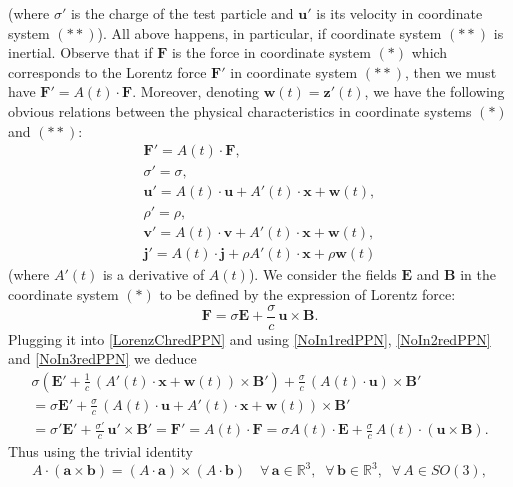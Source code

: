 \documentclass{article}
\theoremstyle{definition}
\theoremstyle{remark}
\renewcommand{\vec}[1]{\mathbf{#1}}
\newcommand{\R}{\mathbb{R}}
\newcommand{\er}{\eqref}
\newcommand{\R}{{\mathbb{R}}}
\newcommand{\er}{\eqref}
\begin{document}
(where $\sigma'$ is the charge of the test particle and $\vec u'$ is
its velocity in coordinate system $(**)$). All above happens, in
particular, if coordinate system $(**)$ is inertial. Observe that if
$\vec F$ is the force in coordinate system $(*)$ which corresponds
to the Lorentz force $\vec F'$ in coordinate system $(**)$, then we
must have $\vec F'=A(t)\cdot\vec F$. Moreover, denoting $\vec
w(t)=\vec z'(t)$, we have the following obvious relations between
the physical characteristics in coordinate systems $(*)$ and $(**)$:
\begin{align}
\label{NoIn1redPPN}\vec F'=A(t)\cdot\vec F,\\
\label{NoIn2redPPN}\sigma'=\sigma,\\
\label{NoIn3redPPN}\vec u'=A(t)\cdot \vec u+A'(t)\cdot\vec x+\vec w(t),\\
\label{NoIn4redPPN}\rho'=\rho,\\
\label{NoIn5redPPN}\vec v'=A(t)\cdot \vec v+A'(t)\cdot\vec x+\vec w(t),\\
\label{NoIn6redPPN}\vec j'=A(t)\cdot \vec j+\rho A'(t)\cdot\vec
x+\rho\vec w(t)
\end{align}
(where $A'(t)$ is a derivative of $A(t)$). We consider the fields
$\vec E$ and $\vec B$ in the coordinate system $(*)$ to be defined
by the expression of Lorentz force:
\begin{equation}\label{LorenzChllredPPN}
\vec F=\sigma \vec E+\frac{\sigma}{c}\,\vec u\times \vec B.
\end{equation}
Plugging it into \er{LorenzChredPPN} and using \er{NoIn1redPPN},
\er{NoIn2redPPN} and \er{NoIn3redPPN} we deduce
\begin{multline}\label{buiguyfttyjredPPN}
\sigma \left(\vec E'+\frac{1}{c}\,\left(A'(t)\cdot\vec x+\vec
w(t)\right)\times \vec B'\right)+\frac{\sigma}{c}\,\left(A(t)\cdot
\vec u\right)\times \vec B'\\=\sigma \vec
E'+\frac{\sigma}{c}\,\left(A(t)\cdot \vec u+A'(t)\cdot\vec x+\vec
w(t)\right)\times \vec B'\\=\sigma' \vec E'+\frac{\sigma'}{c}\,\vec
u'\times \vec B'=\vec F'=A(t)\cdot\vec F=\sigma A(t)\cdot\vec
E+\frac{\sigma}{c}\,A(t)\cdot\left(\vec u\times \vec B\right).
\end{multline}
Thus using the trivial identity
\begin{equation}\label{cufuyggjjjfredPPN}
A\cdot\left(\vec a\times\vec b\right)=\left(A\cdot\vec
a\right)\times\left(A\cdot\vec b\right)\quad\forall\, \vec
a\in\R^3,\;\;\forall\, \vec b\in\R^3,\;\;\forall\, A\in SO(3),
\end{equation}
\end{document}
